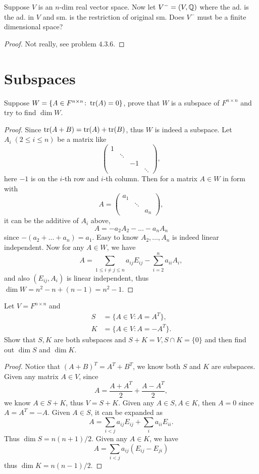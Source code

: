 \begin{pro}%
	Suppose $V$ is an $n$-dim real vector space. Now let $V^-=(V,\mathbb{Q})$ where the ad. is the ad. in $V$ and sm. is the restriction of original sm. Does $V^-$ must be a finite dimensional space?
\end{pro}
\begin{proof}
	Not really, see problem $4.3.6$.
\end{proof}

\section{Subspaces}
\begin{pro}%
	Suppose $W=\{A\in F^{n\times n}\colon \operatorname*{tr}(A)=0\}$, prove that $W$ is a subspace of $F^{n\times n}$ and try to find 
	$\dim W$.
\end{pro}
\begin{proof}
	Since $\operatorname*{tr}(A+B)=\operatorname*{tr}(A)+\operatorname*{tr}(B)$, thus $W$ is indeed a subspace. Let $A_i\;(2\leq i\leq n)$ be a matrix like 
	\[\begin{pmatrix}
	1 & & & \\
	  &\ddots & & \\
	  & &-1& \\
	  & &  & \ddots
	 \end{pmatrix},\]
	here $-1$ is on the $i$-th row and $i$-th column. Then for a matrix $A\in W$ in form with 
	\[A=\begin{pmatrix}
	a_1 & & \\
	    &\ddots & \\
	    & & a_n\end{pmatrix},\]
	it can be the additive of $A_i$ above,
	\[A=-a_2A_2-\dots-a_nA_n\]
	since $-(a_2+\dots +a_n)=a_1$. Easy to know $A_2,\dots, A_n$ is indeed linear independent. Now for any $A\in W$, we have 
	\[A=\sum_{1\leq i\neq j\leq n} a_{ij} E_{ij}-\sum_{i=2}^n a_{ii} A_i,\]
	and also $(E_{ij},A_i)$ is linear independent, thus $\dim W=n^2-n+(n-1)=n^2-1$.
\end{proof} 

\begin{pro}%
	Let $V=F^{n\times n}$ and
	\begin{align*}
	S&=\{A\in V\colon A=A^T\},\\
	K&=\{A\in V\colon A=-A^T\}.
	\end{align*}
	Show that $S,K$ are both subspaces and $S+K=V,S\cap K=\{0\}$ and then find out $\dim S$ and $\dim K$.
\end{pro}
\begin{proof}
	Notice that $(A+B)^T=A^T+B^T$, we know both $S$ and $K$ are subspaces. Given any matrix $A\in V$, since 
	\[A=\frac{A+A^T}{2}+\frac{A-A^T}{2},\]
	we know $A\in S+K$, thus $V=S+K$. Given any $A\in S,A\in K$, then $A=0$ since $A=A^T=-A$. Given $A\in S$, it can be expanded as 
	\[A=\sum_{i<j} a_{ij}E_{ij}+\sum_i a_{ii} E_{ii}.\]
	Thus $\dim S=n(n+1)/2$. Given any $A\in K$, we have
	\[A=\sum_{i<j} a_{ij} (E_{ij}-E_{ji})\]
	thus $\dim K=n(n-1)/2$.
\end{proof}


